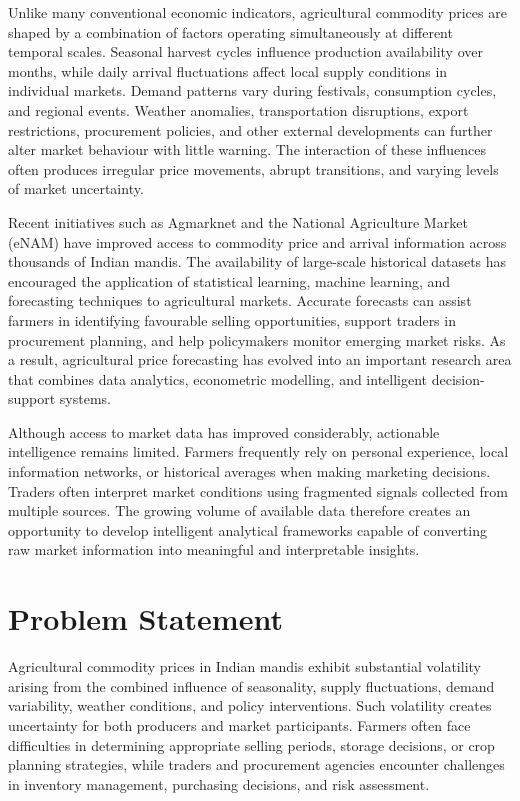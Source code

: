 \documentclass[12pt,a4paper]{report}
\theoremstyle{definition}
\theoremstyle{remark}
\begin{document}
Unlike many conventional economic indicators, agricultural commodity prices are shaped by a combination of factors operating simultaneously at different temporal scales. Seasonal harvest cycles influence production availability over months, while daily arrival fluctuations affect local supply conditions in individual markets. Demand patterns vary during festivals, consumption cycles, and regional events. Weather anomalies, transportation disruptions, export restrictions, procurement policies, and other external developments can further alter market behaviour with little warning. The interaction of these influences often produces irregular price movements, abrupt transitions, and varying levels of market uncertainty.

Recent initiatives such as Agmarknet and the National Agriculture Market (eNAM) have improved access to commodity price and arrival information across thousands of Indian mandis. The availability of large-scale historical datasets has encouraged the application of statistical learning, machine learning, and forecasting techniques to agricultural markets. Accurate forecasts can assist farmers in identifying favourable selling opportunities, support traders in procurement planning, and help policymakers monitor emerging market risks. As a result, agricultural price forecasting has evolved into an important research area that combines data analytics, econometric modelling, and intelligent decision-support systems.

Although access to market data has improved considerably, actionable intelligence remains limited. Farmers frequently rely on personal experience, local information networks, or historical averages when making marketing decisions. Traders often interpret market conditions using fragmented signals collected from multiple sources. The growing volume of available data therefore creates an opportunity to develop intelligent analytical frameworks capable of converting raw market information into meaningful and interpretable insights.

\section{Problem Statement}

Agricultural commodity prices in Indian mandis exhibit substantial volatility arising from the combined influence of seasonality, supply fluctuations, demand variability, weather conditions, and policy interventions. Such volatility creates uncertainty for both producers and market participants. Farmers often face difficulties in determining appropriate selling periods, storage decisions, or crop planning strategies, while traders and procurement agencies encounter challenges in inventory management, purchasing decisions, and risk assessment.
\end{document}
